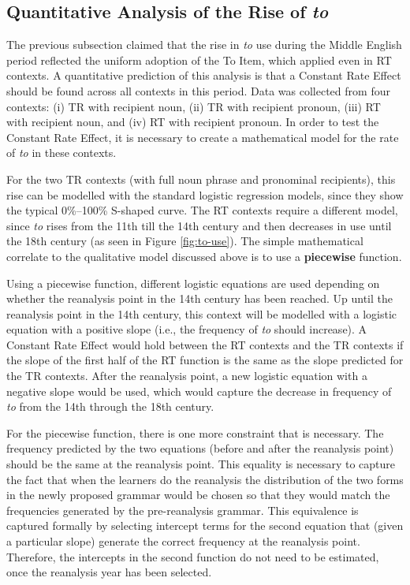 	\subsection{Quantitative Analysis of the Rise of \textit{to}}
		The previous subsection claimed that the rise in \textit{to} use during the Middle English period reflected the uniform adoption of the To Item, which applied even in RT contexts. A quantitative prediction of this analysis is that a Constant Rate Effect should be found across all contexts in this period. Data was collected from four contexts: (i) TR with recipient noun, (ii) TR with recipient pronoun, (iii) RT with recipient noun, and (iv) RT with recipient pronoun. In order to test the Constant Rate Effect, it is necessary to create a mathematical model for the rate of \textit{to} in these contexts.
	
		For the two TR contexts (with full noun phrase and pronominal recipients), this rise can be modelled with the standard logistic regression models, since they show the typical 0\%--100\% S-shaped curve. The RT contexts require a different model, since \textit{to} rises from the 11th till the 14th century and then decreases in use until the 18th century (as seen in Figure \ref{fig:to-use}). The simple mathematical correlate to the qualitative model discussed above is to use a \textbf{piecewise} function. 
	
		Using a piecewise function, different logistic equations are used depending on whether the reanalysis point in the 14th century has been reached. Up until the reanalysis point in the 14th century, this context will be modelled with a logistic equation with a positive slope (i.e., the frequency of \textit{to} should increase). A Constant Rate Effect would hold between the RT contexts and the TR contexts if the slope of the first half of the RT function is the same as the slope predicted for the TR contexts. After the reanalysis point, a new logistic equation with a negative slope would be used, which would capture the decrease in frequency of \textit{to} from the 14th through the 18th century.

	For the piecewise function, there is one more constraint that is necessary. The frequency predicted by the two equations (before and after the reanalysis point) should be the same at the reanalysis point. This equality is necessary to capture the fact that when the learners do the reanalysis the distribution of the two forms in the newly proposed grammar would be chosen so that they would match the frequencies generated by the pre-reanalysis grammar. This equivalence is captured formally by selecting intercept terms for the second equation that (given a particular slope) generate the correct frequency at the reanalysis point. Therefore, the intercepts in the second function do not need to be estimated, once the reanalysis year has been selected.

